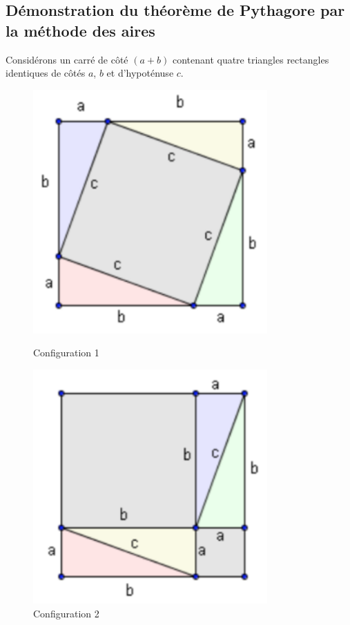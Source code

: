 \subsection{Démonstration du théorème de Pythagore par la méthode des aires}
Considérons un carré de côté $(a + b)$ contenant quatre triangles rectangles identiques de côtés $a$, $b$ et d'hypoténuse $c$.

\begin{figure}[h]
\centering
\begin{minipage}{0.45\textwidth}
    \centering
    \includegraphics[width=0.8\textwidth]{../../assets/images/4e/seq_02_pythagore/fig_demo_pythagore_config_1}
    \caption{Configuration 1}
    \label{fig:config1}
\end{minipage}
\hfill
\begin{minipage}{0.45\textwidth}
    \centering
    \includegraphics[width=0.8\textwidth]{../../assets/images/4e/seq_02_pythagore/fig_demo_pythagore_config_2.png}
    \caption{Configuration 2}
    \label{fig:config2}
\end{minipage}
\end{figure}

